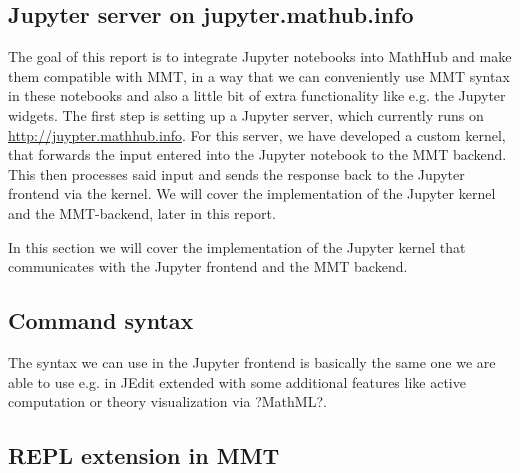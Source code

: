 \subsection{Jupyter server on jupyter.mathub.info}\label{sec:jps}

The goal of this report is to integrate Jupyter notebooks into MathHub
and make them compatible with MMT, in a way that we can conveniently use 
MMT syntax in these notebooks and also a little bit of extra functionality
like e.g. the Jupyter widgets. The first step is setting up a Jupyter server,
which currently runs on \url{http://juypter.mathhub.info}. 
For this server, we have developed a custom kernel, that forwards the input 
entered into the Jupyter notebook to the MMT backend. This then processes 
said input and sends the response back to the Jupyter frontend via the kernel.
We will cover the implementation of the Jupyter kernel and the MMT-backend,
later in this report.

In this section we will cover the implementation of the Jupyter kernel that
communicates with the Jupyter frontend and the MMT backend. 

\subsection{Command syntax}
The syntax we can use in the Jupyter frontend is basically the same one we are able to 
use e.g. in JEdit extended with some additional features like active computation
or theory visualization via ?MathML?. 
\subsection{REPL extension in MMT}

